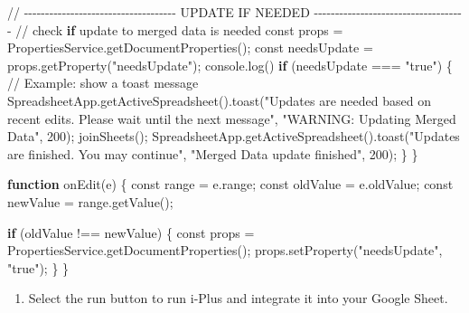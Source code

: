 \documentclass[
  letterpaper,
  DIV=11,
  numbers=noendperiod]{scrartcl}
\newenvironment{Shaded}{\begin{snugshade}}{\end{snugshade}}
\newcommand{\ControlFlowTok}[1]{\textcolor[rgb]{0.00,0.23,0.31}{\textbf{#1}}}
\newcommand{\DecValTok}[1]{\textcolor[rgb]{0.68,0.00,0.00}{#1}}
\newcommand{\ErrorTok}[1]{\textcolor[rgb]{0.68,0.00,0.00}{#1}}
\newcommand{\FunctionTok}[1]{\textcolor[rgb]{0.28,0.35,0.67}{#1}}
\newcommand{\NormalTok}[1]{\textcolor[rgb]{0.00,0.23,0.31}{#1}}
\newcommand{\OtherTok}[1]{\textcolor[rgb]{0.00,0.23,0.31}{#1}}
\newcommand{\SpecialCharTok}[1]{\textcolor[rgb]{0.37,0.37,0.37}{#1}}
\newcommand{\StringTok}[1]{\textcolor[rgb]{0.13,0.47,0.30}{#1}}
\providecommand{\tightlist}{%
  \setlength{\itemsep}{0pt}\setlength{\parskip}{0pt}}\usepackage{longtable,booktabs,array}
\begin{document}
\begin{Shaded}
\begin{Highlighting}[]
 \SpecialCharTok{/}\ErrorTok{/} \SpecialCharTok{{-}{-}{-}{-}{-}{-}{-}{-}{-}{-}{-}{-}{-}{-}{-}{-}{-}{-}{-}{-}{-}{-}{-}{-}{-}{-}{-}{-}{-}{-}{-}{-}{-}{-}{-}{-}}\NormalTok{ UPDATE IF NEEDED }\SpecialCharTok{{-}{-}{-}{-}{-}{-}{-}{-}{-}{-}{-}{-}{-}{-}{-}{-}{-}{-}{-}{-}{-}{-}{-}{-}{-}{-}{-}{-}{-}{-}{-}{-}{-}{-}{-}{-}}
  \ErrorTok{//}\NormalTok{ check }\ControlFlowTok{if}\NormalTok{ update to merged data is needed}
\NormalTok{  const props }\OtherTok{=} \FunctionTok{PropertiesService.getDocumentProperties}\NormalTok{();}
\NormalTok{  const needsUpdate }\OtherTok{=} \FunctionTok{props.getProperty}\NormalTok{(}\StringTok{"needsUpdate"}\NormalTok{);}
  \FunctionTok{console.log}\NormalTok{()}
  \ControlFlowTok{if}\NormalTok{ (needsUpdate }\SpecialCharTok{==}\ErrorTok{=} \StringTok{"true"}\NormalTok{) \{}
    \SpecialCharTok{/}\ErrorTok{/}\NormalTok{ Example}\SpecialCharTok{:}\NormalTok{ show a toast message}
    \FunctionTok{SpreadsheetApp.getActiveSpreadsheet}\NormalTok{()}\FunctionTok{.toast}\NormalTok{(}\StringTok{"Updates are needed based on recent edits. Please wait until the next message"}\NormalTok{, }\StringTok{"WARNING: Updating \textasciigrave{}Merged Data\textasciigrave{}"}\NormalTok{, }\DecValTok{200}\NormalTok{);}
    \FunctionTok{joinSheets}\NormalTok{();}
    \FunctionTok{SpreadsheetApp.getActiveSpreadsheet}\NormalTok{()}\FunctionTok{.toast}\NormalTok{(}\StringTok{"Updates are finished. You may continue"}\NormalTok{, }\StringTok{"\textasciigrave{}Merged Data\textasciigrave{} update finished"}\NormalTok{, }\DecValTok{200}\NormalTok{);}
\NormalTok{\}}
\NormalTok{\}}


\ControlFlowTok{function} \FunctionTok{onEdit}\NormalTok{(e) \{}
\NormalTok{  const range }\OtherTok{=}\NormalTok{ e.range;}
\NormalTok{  const oldValue }\OtherTok{=}\NormalTok{ e.oldValue;}
\NormalTok{  const newValue }\OtherTok{=} \FunctionTok{range.getValue}\NormalTok{();}

  \ControlFlowTok{if}\NormalTok{ (oldValue }\SpecialCharTok{!=}\ErrorTok{=}\NormalTok{ newValue) \{}
\NormalTok{    const props }\OtherTok{=} \FunctionTok{PropertiesService.getDocumentProperties}\NormalTok{();}
    \FunctionTok{props.setProperty}\NormalTok{(}\StringTok{"needsUpdate"}\NormalTok{, }\StringTok{"true"}\NormalTok{);}
\NormalTok{  \}}
\NormalTok{\}}
\end{Highlighting}
\end{Shaded}

\begin{enumerate}
\def\labelenumi{\arabic{enumi}.}
\setcounter{enumi}{5}
\tightlist
\item
  Select the run button to run i-Plus and integrate it into your Google
  Sheet.
\end{enumerate}
\end{document}
